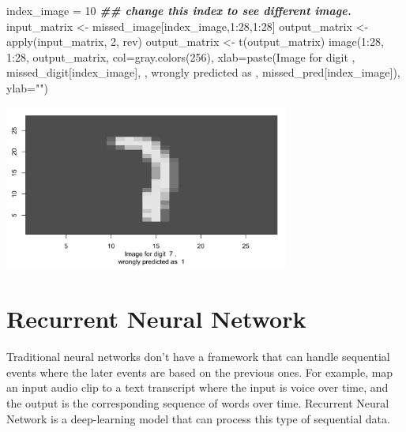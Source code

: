 \documentclass[
  12pt,
]{krantz}
\makeatletter
\newenvironment{Shaded}{\begin{snugshade}}{\end{snugshade}}
\newcommand{\AttributeTok}[1]{\textcolor[rgb]{0.61,0.61,0.61}{#1}}
\newcommand{\DecValTok}[1]{\textcolor[rgb]{0.06,0.06,0.06}{#1}}
\newcommand{\DocumentationTok}[1]{\textcolor[rgb]{0.37,0.37,0.37}{\textbf{\textit{#1}}}}
\newcommand{\FunctionTok}[1]{\textcolor[rgb]{0,0,0}{#1}}
\newcommand{\NormalTok}[1]{#1}
\newcommand{\OtherTok}[1]{\textcolor[rgb]{0.37,0.37,0.37}{#1}}
\newcommand{\SpecialCharTok}[1]{\textcolor[rgb]{0,0,0}{#1}}
\newcommand{\StringTok}[1]{\textcolor[rgb]{0.5,0.5,0.5}{#1}}
\newenvironment{kframe}{%
\medskip{}
\setlength{\fboxsep}{.8em}
 \def\at@end@of@kframe{}%
 \ifinner\ifhmode%
  \def\at@end@of@kframe{\end{minipage}}%
  \begin{minipage}{\columnwidth}%
 \fi\fi%
 \def\FrameCommand##1{\hskip\@totalleftmargin \hskip-\fboxsep
 \colorbox{shadecolor}{##1}\hskip-\fboxsep
     \hskip-\linewidth \hskip-\@totalleftmargin \hskip\columnwidth}%
 \MakeFramed {\advance\hsize-\width
   \@totalleftmargin\z@ \linewidth\hsize
   \@setminipage}}%
 {\par\unskip\endMakeFramed%
 \at@end@of@kframe}
\renewenvironment{Shaded}{\begin{kframe}}{\end{kframe}}
\makeatother
\begin{document}
\begin{Shaded}
\begin{Highlighting}[]
\NormalTok{index\_image }\OtherTok{=} \DecValTok{10} \DocumentationTok{\#\# change this index to see different image.}
\NormalTok{input\_matrix }\OtherTok{\textless{}{-}}\NormalTok{ missed\_image[index\_image,}\DecValTok{1}\SpecialCharTok{:}\DecValTok{28}\NormalTok{,}\DecValTok{1}\SpecialCharTok{:}\DecValTok{28}\NormalTok{]}
\NormalTok{output\_matrix }\OtherTok{\textless{}{-}} \FunctionTok{apply}\NormalTok{(input\_matrix, }\DecValTok{2}\NormalTok{, rev)}
\NormalTok{output\_matrix }\OtherTok{\textless{}{-}} \FunctionTok{t}\NormalTok{(output\_matrix)}
\FunctionTok{image}\NormalTok{(}\DecValTok{1}\SpecialCharTok{:}\DecValTok{28}\NormalTok{, }\DecValTok{1}\SpecialCharTok{:}\DecValTok{28}\NormalTok{, output\_matrix, }\AttributeTok{col=}\FunctionTok{gray.colors}\NormalTok{(}\DecValTok{256}\NormalTok{), }
\AttributeTok{xlab=}\FunctionTok{paste}\NormalTok{(}\StringTok{\textquotesingle{}Image for digit \textquotesingle{}}\NormalTok{, missed\_digit[index\_image], }\StringTok{\textquotesingle{}, }
\StringTok{wrongly predicted as \textquotesingle{}}\NormalTok{, missed\_pred[index\_image]), }\AttributeTok{ylab=}\StringTok{""}\NormalTok{)}
\end{Highlighting}
\end{Shaded}

\includegraphics[width=0.7\textwidth,height=\textheight]{images/misclassified_img_cnn.png}

\hypertarget{recurrent-neural-network}{%
\section{Recurrent Neural Network}\label{recurrent-neural-network}}

Traditional neural networks don't have a framework that can handle sequential events where the later events are based on the previous ones. For example, map an input audio clip to a text transcript where the input is voice over time, and the output is the corresponding sequence of words over time. Recurrent Neural Network is a deep-learning model that can process this type of sequential data.
\end{document}
